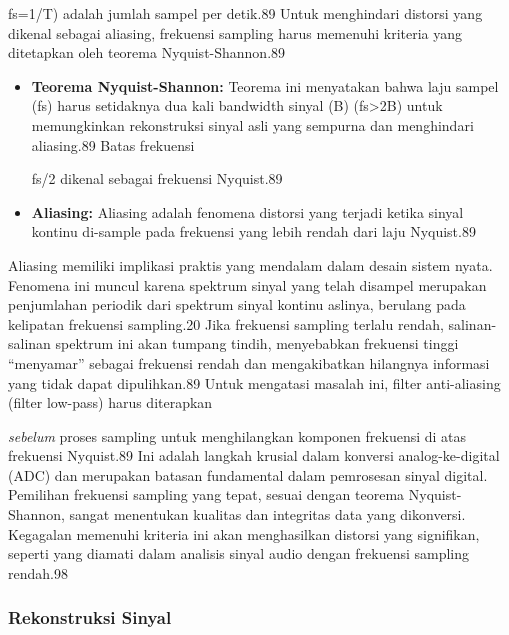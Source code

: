 \documentclass[
  letterpaper,
  DIV=11,
  numbers=noendperiod]{scrreprt}
\begin{document}
fs\hspace{0pt}=1/T) adalah jumlah sampel per detik.89 Untuk menghindari
distorsi yang dikenal sebagai aliasing, frekuensi sampling harus
memenuhi kriteria yang ditetapkan oleh teorema Nyquist-Shannon.89

\begin{itemize}
\item
  \textbf{Teorema Nyquist-Shannon:} Teorema ini menyatakan bahwa laju
  sampel (fs\hspace{0pt}) harus setidaknya dua kali bandwidth sinyal (B)
  (fs\hspace{0pt}\textgreater2B) untuk memungkinkan rekonstruksi sinyal
  asli yang sempurna dan menghindari aliasing.89 Batas frekuensi

  fs\hspace{0pt}/2 dikenal sebagai frekuensi Nyquist.89
\item
  \textbf{Aliasing:} Aliasing adalah fenomena distorsi yang terjadi
  ketika sinyal kontinu di-sample pada frekuensi yang lebih rendah dari
  laju Nyquist.89
\end{itemize}

Aliasing memiliki implikasi praktis yang mendalam dalam desain sistem
nyata. Fenomena ini muncul karena spektrum sinyal yang telah disampel
merupakan penjumlahan periodik dari spektrum sinyal kontinu aslinya,
berulang pada kelipatan frekuensi sampling.20 Jika frekuensi sampling
terlalu rendah, salinan-salinan spektrum ini akan tumpang tindih,
menyebabkan frekuensi tinggi ``menyamar'' sebagai frekuensi rendah dan
mengakibatkan hilangnya informasi yang tidak dapat dipulihkan.89 Untuk
mengatasi masalah ini, filter anti-aliasing (filter low-pass) harus
diterapkan

\emph{sebelum} proses sampling untuk menghilangkan komponen frekuensi di
atas frekuensi Nyquist.89 Ini adalah langkah krusial dalam konversi
analog-ke-digital (ADC) dan merupakan batasan fundamental dalam
pemrosesan sinyal digital. Pemilihan frekuensi sampling yang tepat,
sesuai dengan teorema Nyquist-Shannon, sangat menentukan kualitas dan
integritas data yang dikonversi. Kegagalan memenuhi kriteria ini akan
menghasilkan distorsi yang signifikan, seperti yang diamati dalam
analisis sinyal audio dengan frekuensi sampling rendah.98

\subsubsection{Rekonstruksi Sinyal}\label{rekonstruksi-sinyal}
\end{document}
